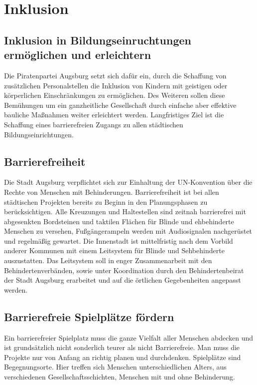 \chapter{Inklusion}

  \section{Inklusion in Bildungseinruchtungen ermöglichen und erleichtern}
  
  Die Piratenpartei Augsburg setzt sich dafür ein, durch die Schaffung von 
  zusätzlichen Personalstellen die Inklusion von Kindern mit geistigen oder 
  körperlichen Einschränkungen zu ermöglichen. Des Weiteren sollen diese 
  Bemühungen um ein ganzheitliche Gesellschaft durch einfache aber effektive 
  bauliche Maßnahmen weiter erleichtert werden. Langfristiges Ziel ist die 
  Schaffung eines barrierefreien Zugangs zu allen städtischen 
  Bildungseinrichtungen.
  
  \section{Barrierefreiheit}
  
  Die Stadt Augsburg verpflichtet sich zur Einhaltung der UN-Konvention über   
  die Rechte von Menschen mit Behinderungen. Barrierefreiheit ist bei allen 
  städtischen Projekten bereits zu Beginn in den Planungsphasen zu 
  berücksichtigen. Alle Kreuzungen und Haltestellen sind zeitnah barrierefrei 
  mit abgesenkten Bordsteinen und taktilen Flächen für Blinde und ehbehinderte 
  Menschen zu versehen, Fußgängerampeln werden mit Audiosignalen nachgerüstet 
  und regelmäßig gewartet. Die Innenstadt ist mittelfristig nach dem Vorbild 
  anderer Kommunen mit einem Leitsystem für Blinde und Sehbehinderte 
  auszustatten. Das Leitsystem soll in enger Zusammenarbeit mit den 
  Behindertenverbänden, sowie unter Koordination durch den Behindertenbeirat 
  der Stadt Augsburg erarbeitet und auf die örtlichen Gegebenheiten angepasst 
  werden.
  
  \section{Barrierefreie Spielplätze fördern}
  
  Ein barrierefreier Spielplatz muss die ganze Vielfalt aller Menschen 
  abdecken und ist grundsätzlich nicht sonderlich teurer als nicht   
  Barrierefreie. Man muss die Projekte nur von Anfang an richtig planen und 
  durchdenken. Spielplätze sind Begegnungsorte. Hier treffen sich Menschen 
  unterschiedlichen Alters, aus verschiedenen Gesellschaftsschichten, Menschen 
  mit und ohne Behinderung.
  

